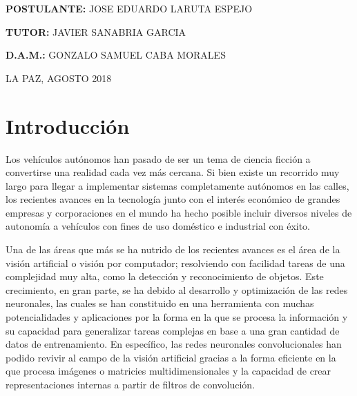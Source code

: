 \documentclass[12pt,letterpaper]{article}
\begin{document}
\begin{titlepage}
\begin{center}
\vspace*{0.2in}

\begin{large}
\textbf{POSTULANTE:} JOSE EDUARDO LARUTA ESPEJO\\
\end{large}

\begin{large}
\hspace{0.08in} \textbf{TUTOR:} JAVIER SANABRIA GARCIA\\
\end{large}

\begin{large}
\hspace{0.44in} \textbf{D.A.M.:} GONZALO SAMUEL CABA MORALES\\
\end{large}

\vspace*{0.2in}

\begin{normalsize}
LA PAZ, AGOSTO 2018\\
\end{normalsize}
\end{center}
\end{titlepage}


\thispagestyle{empty}
\tableofcontents
\newpage



\section{Introducción}

Los vehículos autónomos han pasado de ser un tema de ciencia ficción a convertirse una realidad cada vez más 
cercana. Si bien existe un recorrido muy largo para llegar a implementar sistemas completamente autónomos en las calles, 
los recientes avances en la tecnología junto con el interés económico de grandes empresas y corporaciones en el mundo 
ha hecho posible incluir diversos niveles de autonomía a vehículos con fines de uso doméstico e industrial con éxito.

Una de las áreas que más se ha nutrido de los recientes avances es el área de la visión artificial o visión por computador; 
resolviendo con facilidad tareas de una complejidad muy alta, como la detección y reconocimiento de objetos. 
Este crecimiento, en gran parte, se ha debido al desarrollo y optimización de las redes neuronales, las cuales se han 
constituido en una herramienta con muchas potencialidades y aplicaciones por la forma en la que se procesa la información 
y su capacidad para generalizar tareas complejas en base a una gran cantidad de datos de entrenamiento. En específico, 
las redes neuronales convolucionales han podido revivir al campo de la visión artificial gracias a la forma eficiente 
en la que procesa imágenes o matricies multidimensionales y la capacidad de crear representaciones internas a partir 
de filtros de convolución.
\end{document}
